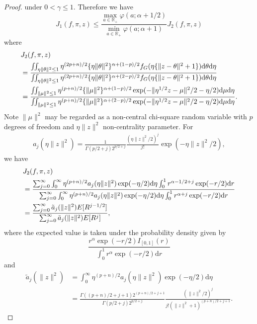 \documentclass[preprint,11pt]{imsart}
\numberwithin{equation}{section}
\theoremstyle{plain}
\theoremstyle{definition}
\theoremstyle{remark}
\newcommand{\rd}{\mathrm{d}}
\begin{document}
\begin{proof}
under $0<\gamma\leq 1$. Therefore we have
 \begin{equation}\label{M1M2}
   J_1(f,\pi,z)
   \leq \frac{\max_{a\in\mathbb{R}_+}\varphi(a;\alpha+1/2)}
  {\min_{a\in\mathbb{R}_+}\varphi(a;\alpha+1)}J_2(f,\pi,z)
 \end{equation}
 where
\begin{align}
& J_2(f,\pi,z) \label{def:M2}\\ &= \frac{\iint_{\eta\|\theta\|^2\leq 1} 
  \eta^{(2p+n)/2} \{\eta\|\theta\|^2\}^{\alpha+(1-p)/2} f_G(\eta\{\|z-\theta\|^2+1\}) 
 \rd \theta   \rd \eta}{\iint_{\eta\|\theta\|^2\leq 1}  
  \eta^{(2p+n)/2} \{\eta\|\theta\|^2\}^{\alpha+(2-p)/2} f_G(\eta\{\|z-\theta\|^2+1\}) 
  \rd \theta   \rd \eta} \notag \\
&=\frac{\iint_{\|\mu\|^2\leq 1} 
  \eta^{(p+n)/2} \{\|\mu\|^2\}^{\alpha+(1-p)/2} \exp(-\|\eta^{1/2}z-\mu\|^2/2-\eta/2)
 \rd \mu  \rd \eta}
{\iint_{\|\mu\|^2\leq 1} 
  \eta^{(p+n)/2} \{\|\mu\|^2\}^{\alpha+(2-p)/2} \exp(-\|\eta^{1/2}z-\mu\|^2/2-\eta/2)
 \rd \mu  \rd \eta}.\notag
\end{align}
Note $\| \mu\|^2$ may be regarded as a non-central chi-square random variable
 with $p$ degrees of freedom and $\eta\|  z \|^2$ non-centrality parameter.
For 
 \begin{align*}
 a_j( \eta\|z\|^2 )=\frac{1}{\Gamma(p/2+j)2^{p/2+j}}\frac{(\eta\|  z \|^2/2)^j}{j!}\exp(-\eta\|  z \|^2/2),
 \end{align*}
 we have
 \begin{align}
&J_2(f,\pi,z) \notag\\
  &= \frac{\sum_{j=0}^\infty \int_0^\infty \eta^{(p+n)/2} a_j( \eta\|z\|^2 )\exp(-\eta/2)\rd \eta\int_0^1 r^{\alpha-1/2+j}\exp(-r/2) \rd r}
  {\sum_{j=0}^\infty \int_0^\infty \eta^{(p+n)/2} a_j( \eta\|z\|^2 )\exp(-\eta/2)\rd \eta\int_0^1
  r^{\alpha+j}\exp(-r/2) \rd r} \notag\\ 
  &=\frac{\sum_{j=0}^\infty \tilde{a}_j(\|z\|^2) E[R^{j-1/2}]}
  {\sum_{j=0}^\infty \tilde{a}_j(\|z\|^2) E[R^{j}]},\notag
 \end{align}
where the expected value is taken under the probability density given by
\begin{equation*}
 \frac{r^{\alpha}\exp(-r/2)I_{[0,1]}(r)}{\int_0^1r^{\alpha}\exp(-r/2) \rd r}
\end{equation*}
 and
\begin{align*}
 \tilde{a}_j(\|z\|^2)&=\int_0^\infty \eta^{(p+n)/2} a_j( \eta\|z\|^2 )\exp(-\eta/2)\rd \eta \\
 &=\frac{\Gamma((p+n)/2+j+1)2^{(p+n)/2+j+1}}{\Gamma(p/2+j)2^{p/2+j}}\frac{(\|  z \|^2/2)^j}{j!(\|  z \|^2+1)^{(p+n)/2+j+1}}.

\end{align*}
\end{proof}
\end{document}
